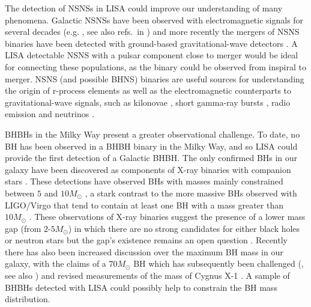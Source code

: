 The detection of NSNSs in LISA could improve our understanding of many phenomena. Galactic NSNSs have been observed with electromagnetic signals for several decades (e.g. \citealp{Hulse+1975, Antoniadis+2016}, see also refs.\ in \citealp{Tauris+2017}) and more recently the mergers of NSNS binaries have been detected with ground-based gravitational-wave detectors \citep[e.g.][]{Abbott+2017_NSNS}. A LISA detectable NSNS with a pulsar component close to merger would be ideal for connecting these populations, as the binary could be observed from inspiral to merger. NSNS (and possible BHNS) binaries are useful sources for understanding the origin of r-process elements \citep[e.g.][]{Eichler+1989} as well as the electromagnetic counterparts to gravitational-wave signals, such as kilonovae \citep[e.g.][]{Li+1998, Metzger+2017}, short gamma-ray bursts \citep[e.g.][]{Berger+2014}, radio emission \citep[e.g.][]{Hotokezaka+2016} and neutrinos \citep[e.g.][]{Kyutoku+2018}.

BHBHs in the Milky Way present a greater observational challenge. To date, no BH has been observed in a BHBH binary in the Milky Way, and so LISA could provide the first detection of a Galactic BHBH. The only confirmed BHs in our galaxy have been discovered as components of X-ray binaries with companion stars \citep[e.g.][]{Bolton+1972,Webster+1972}. These detections have observed BHs with masses mainly constrained between $5$ and $10 \unit{M_\odot}$ \citep{Corral-Santana+2016}, a stark contrast to the more massive BHs observed with LIGO/Virgo that tend to contain at least one BH with a mass greater than $10 \unit{M_{\odot}}$ \citep{Abbott+2020_GWTC2}. These observations of X-ray binaries suggest the presence of a lower mass gap (from $2$-$5 \unit{M_{\odot}}$) in which there are no strong candidates for either black holes or neutron stars \citep{Ozel+2010,Farr+2011} but the gap's existence remains an open question \citep[e.g.][]{Kreidberg+2012, Mandel+2020}. Recently there has also been increased discussion over the maximum BH mass in our galaxy, with the claims of a $70 \unit{M_{\odot}}$ BH \citep{Liu+2019} which has subsequently been challenged (\citealp{El-Badry+2020, Abdul-Masih+2020, Shenar+2020,Eldridge+2020}, see also \citealp{Liu+2020}) and revised measurements of the mass of Cygnus X-1 \citep{Miller-Jones+2021}. A sample of BHBHs detected with LISA could possibly help to constrain the BH mass distribution.

